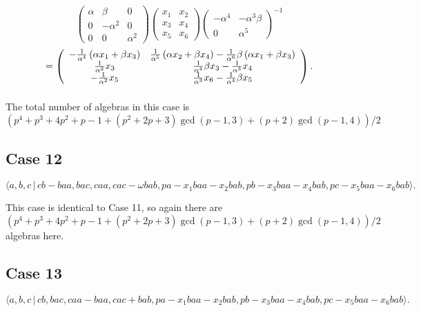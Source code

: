 \documentclass[10pt,thmsa]{article}
\begin{document}
\[
\left( 
\begin{array}{lll}
\alpha & \beta & 0 \\ 
0 & -\alpha ^{2} & 0 \\ 
0 & 0 & \alpha ^{2}%
\end{array}%
\right) \left( 
\begin{array}{cc}
x_{1} & x_{2} \\ 
x_{3} & x_{4} \\ 
x_{5} & x_{6}%
\end{array}%
\right) \left( 
\begin{array}{ll}
-\alpha ^{4} & -\alpha ^{3}\beta \\ 
0 & \alpha ^{5}%
\end{array}%
\right) ^{-1} 
\]
\[
=\left( 
\begin{array}{cc}
-\frac{1}{\alpha ^{4}}\left( \alpha x_{1}+\beta x_{3}\right) & \frac{1}{%
\alpha ^{5}}\left( \alpha x_{2}+\beta x_{4}\right) -\frac{1}{\alpha ^{6}}%
\beta \left( \alpha x_{1}+\beta x_{3}\right) \\ 
\frac{1}{\alpha ^{2}}x_{3} & \frac{1}{\alpha ^{4}}\beta x_{3}-\frac{1}{%
\alpha ^{3}}x_{4} \\ 
-\frac{1}{\alpha ^{2}}x_{5} & \frac{1}{\alpha ^{3}}x_{6}-\frac{1}{\alpha ^{4}%
}\beta x_{5}%
\end{array}%
\right) . 
\]%
$\allowbreak \allowbreak $

The total number of algebras in this case is 
\[
\allowbreak (p^{4}+p^{3}+4p^{2}+p-1+\allowbreak (p^{2}+2p+3)\gcd
(p-1,3)+(p+2)\gcd (p-1,4))/2 
\]

\subsection{Case 12}

\[
\langle a,b,c\,|\,cb-baa,bac,caa,cac-\omega
bab,pa-x_{1}baa-x_{2}bab,pb-x_{3}baa-x_{4}bab,pc-x_{5}baa-x_{6}bab\rangle . 
\]

This case is identical to Case 11, so again there are 
\[
\allowbreak (p^4+p^3+4p^2+p-1+\allowbreak (p^2+2p+3)\gcd (p-1,3)+(p+2)\gcd
(p-1,4))/2 
\]
algebras here.

\subsection{Case 13}

\[
\langle
a,b,c\,|%
\,cb,bac,caa-baa,cac+bab,pa-x_{1}baa-x_{2}bab,pb-x_{3}baa-x_{4}bab,pc-x_{5}baa-x_{6}bab\rangle . 
\]
\end{document}
